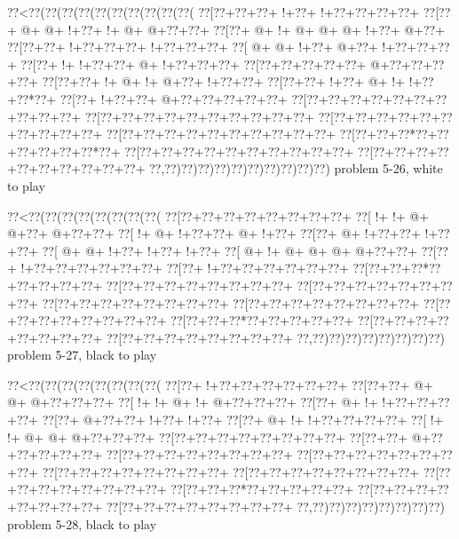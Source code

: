 \vbox{\vbox{\goo
\0??<\0??(\0??(\0??(\0??(\0??(\0??(\0??(\0??(\0??(\0??(
\0??[\0??+\0??+\0??+\- !+\0??+\- !+\0??+\0??+\0??+\0??+
\0??[\0??+\- @+\- @+\- !+\0??+\- !+\- @+\- @+\0??+\0??+
\0??[\0??+\- @+\- !+\- @+\- @+\- @+\- !+\0??+\- @+\0??+
\0??[\0??+\0??+\- !+\0??+\0??+\0??+\- !+\0??+\0??+\0??+
\0??[\- @+\- @+\- !+\0??+\- @+\0??+\- !+\0??+\0??+\0??+
\0??[\0??+\- !+\- !+\0??+\0??+\- @+\- !+\0??+\0??+\0??+
\0??[\0??+\0??+\0??+\0??+\0??+\- @+\0??+\0??+\0??+\0??+
\0??[\0??+\0??+\- !+\- @+\- !+\- @+\0??+\- !+\0??+\0??+
\0??[\0??+\0??+\- !+\0??+\- @+\- !+\- !+\0??+\0??*\0??+
\0??[\0??+\- !+\0??+\0??+\- @+\0??+\0??+\0??+\0??+\0??+
\0??[\0??+\0??+\0??+\0??+\0??+\0??+\0??+\0??+\0??+\0??+
\0??[\0??+\0??+\0??+\0??+\0??+\0??+\0??+\0??+\0??+\0??+
\0??[\0??+\0??+\0??+\0??+\0??+\0??+\0??+\0??+\0??+\0??+
\0??[\0??+\0??+\0??+\0??+\0??+\0??+\0??+\0??+\0??+\0??+
\0??[\0??+\0??+\0??*\0??+\0??+\0??+\0??+\0??+\0??*\0??+
\0??[\0??+\0??+\0??+\0??+\0??+\0??+\0??+\0??+\0??+\0??+
\0??[\0??+\0??+\0??+\0??+\0??+\0??+\0??+\0??+\0??+\0??+
\0??,\0??)\0??)\0??)\0??)\0??)\0??)\0??)\0??)\0??)\0??)
}
\hfil problem 5-26, white to play\hfil\break
}

\vbox{\vbox{\goo
\0??<\0??(\0??(\0??(\0??(\0??(\0??(\0??(\0??(
\0??[\0??+\0??+\0??+\0??+\0??+\0??+\0??+\0??+
\0??[\- !+\- !+\- @+\- @+\0??+\- @+\0??+\0??+
\0??[\- !+\- @+\- !+\0??+\0??+\- @+\- !+\0??+
\0??[\0??+\- @+\- !+\0??+\0??+\- !+\0??+\0??+
\0??[\- @+\- @+\- !+\0??+\- !+\0??+\- !+\0??+
\0??[\- @+\- !+\- @+\- @+\- @+\- @+\0??+\0??+
\0??[\0??+\- !+\0??+\0??+\0??+\0??+\0??+\0??+
\0??[\0??+\- !+\0??+\0??+\0??+\0??+\0??+\0??+
\0??[\0??+\0??+\0??*\0??+\0??+\0??+\0??+\0??+
\0??[\0??+\0??+\0??+\0??+\0??+\0??+\0??+\0??+
\0??[\0??+\0??+\0??+\0??+\0??+\0??+\0??+\0??+
\0??[\0??+\0??+\0??+\0??+\0??+\0??+\0??+\0??+
\0??[\0??+\0??+\0??+\0??+\0??+\0??+\0??+\0??+
\0??[\0??+\0??+\0??+\0??+\0??+\0??+\0??+\0??+
\0??[\0??+\0??+\0??*\0??+\0??+\0??+\0??+\0??+
\0??[\0??+\0??+\0??+\0??+\0??+\0??+\0??+\0??+
\0??[\0??+\0??+\0??+\0??+\0??+\0??+\0??+\0??+
\0??,\0??)\0??)\0??)\0??)\0??)\0??)\0??)\0??)
}
\hfil problem 5-27, black to play\hfil\break
}

\vbox{\vbox{\goo
\0??<\0??(\0??(\0??(\0??(\0??(\0??(\0??(\0??(
\0??[\0??+\- !+\0??+\0??+\0??+\0??+\0??+\0??+
\0??[\0??+\0??+\- @+\- @+\- @+\0??+\0??+\0??+
\0??[\- !+\- !+\- @+\- !+\- @+\0??+\0??+\0??+
\0??[\0??+\- @+\- !+\- !+\0??+\0??+\0??+\0??+
\0??[\0??+\- @+\0??+\0??+\- !+\0??+\- !+\0??+
\0??[\0??+\- @+\- !+\- !+\0??+\0??+\0??+\0??+
\0??[\- !+\- !+\- @+\- @+\- @+\0??+\0??+\0??+
\0??[\0??+\0??+\0??+\0??+\0??+\0??+\0??+\0??+
\0??[\0??+\0??+\- @+\0??+\0??+\0??+\0??+\0??+
\0??[\0??+\0??+\0??+\0??+\0??+\0??+\0??+\0??+
\0??[\0??+\0??+\0??+\0??+\0??+\0??+\0??+\0??+
\0??[\0??+\0??+\0??+\0??+\0??+\0??+\0??+\0??+
\0??[\0??+\0??+\0??+\0??+\0??+\0??+\0??+\0??+
\0??[\0??+\0??+\0??+\0??+\0??+\0??+\0??+\0??+
\0??[\0??+\0??+\0??*\0??+\0??+\0??+\0??+\0??+
\0??[\0??+\0??+\0??+\0??+\0??+\0??+\0??+\0??+
\0??[\0??+\0??+\0??+\0??+\0??+\0??+\0??+\0??+
\0??,\0??)\0??)\0??)\0??)\0??)\0??)\0??)\0??)
}
\hfil problem 5-28, black to play\hfil\break
}


